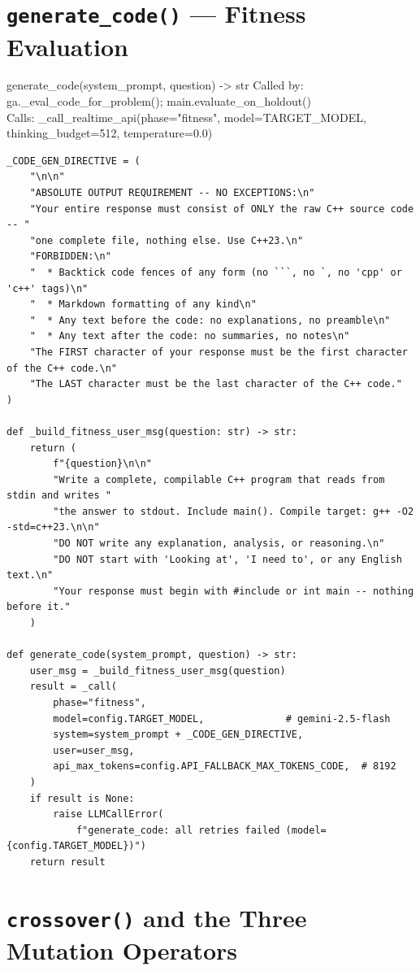 \documentclass[11pt,a4paper]{report}
\newcommand{\fn}[1]{\texttt{#1}}
\begin{document}
\section{\fn{generate\_code()} --- Fitness Evaluation}

\begin{spec}{generate\_code(system\_prompt, question) -> str}
Called by: ga.\_eval\_code\_for\_problem(); main.evaluate\_on\_holdout() \\
Calls: \_call\_realtime\_api(phase="fitness", model=TARGET\_MODEL,
thinking\_budget=512, temperature=0.0)
\end{spec}

\begin{lstlisting}[style=py]
_CODE_GEN_DIRECTIVE = (
    "\n\n"
    "ABSOLUTE OUTPUT REQUIREMENT -- NO EXCEPTIONS:\n"
    "Your entire response must consist of ONLY the raw C++ source code -- "
    "one complete file, nothing else. Use C++23.\n"
    "FORBIDDEN:\n"
    "  * Backtick code fences of any form (no ```, no `, no 'cpp' or 'c++' tags)\n"
    "  * Markdown formatting of any kind\n"
    "  * Any text before the code: no explanations, no preamble\n"
    "  * Any text after the code: no summaries, no notes\n"
    "The FIRST character of your response must be the first character of the C++ code.\n"
    "The LAST character must be the last character of the C++ code."
)

def _build_fitness_user_msg(question: str) -> str:
    return (
        f"{question}\n\n"
        "Write a complete, compilable C++ program that reads from stdin and writes "
        "the answer to stdout. Include main(). Compile target: g++ -O2 -std=c++23.\n\n"
        "DO NOT write any explanation, analysis, or reasoning.\n"
        "DO NOT start with 'Looking at', 'I need to', or any English text.\n"
        "Your response must begin with #include or int main -- nothing before it."
    )

def generate_code(system_prompt, question) -> str:
    user_msg = _build_fitness_user_msg(question)
    result = _call(
        phase="fitness",
        model=config.TARGET_MODEL,              # gemini-2.5-flash
        system=system_prompt + _CODE_GEN_DIRECTIVE,
        user=user_msg,
        api_max_tokens=config.API_FALLBACK_MAX_TOKENS_CODE,  # 8192
    )
    if result is None:
        raise LLMCallError(
            f"generate_code: all retries failed (model={config.TARGET_MODEL})")
    return result
\end{lstlisting}

\section{\fn{crossover()} and the Three Mutation Operators}
\end{document}
